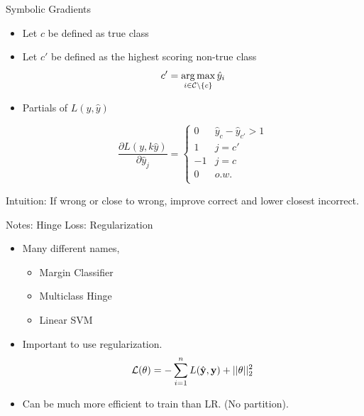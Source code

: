\documentclass{beamer}
\begin{document}
\begin{frame}{Symbolic Gradients}

  \begin{itemize}
  \item   Let $c$ be defined as true class
  \item   Let $c'$ be defined as the highest scoring non-true class 
    \[c' = \argmax_{i \in \mcC \setminus\{c\}} \hat{y}_i \] 
  \item Partials of $L(y, \hat{y})$

  \[ \frac{\partial L(y,k \hat{y})}{\partial \hat{y}_j} =
      \begin{cases}
         0 & \hat{y}_c - \hat{y}_{c'} > 1  \\
         1 & j = c' \\
         -1 & j = c \\
         0 & o.w. \\ 
      \end{cases}
  \]
  \end{itemize}
  Intuition: If wrong or close to wrong, improve correct and lower closest incorrect.
\end{frame}


\begin{frame}{Notes: Hinge Loss: Regularization}
  \begin{itemize}
  \item   Many different names,
  \begin{itemize}
  \item Margin Classifier
  \item Multiclass Hinge
  \item Linear SVM
  \end{itemize}

  \item Important to use regularization.  
  \[ \mathcal{L}(\theta) = - \sum_{i=1}^n L(\hat{\mathbf{y}}, \mathbf{y}) + ||\theta||^2_2\] 

  \item Can be much more efficient to train than LR. (No partition).

  \end{itemize}
\end{frame}
\end{document}
